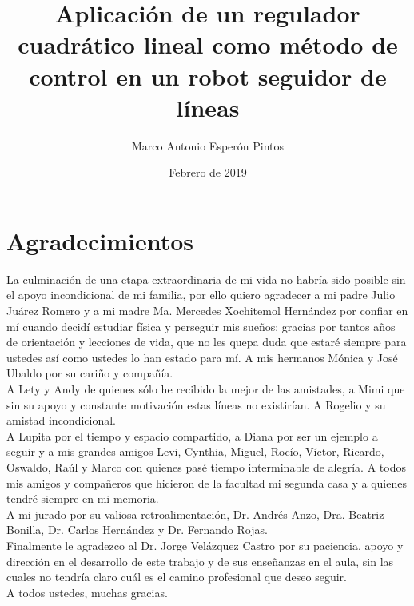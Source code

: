 \documentclass[fisica]{fcfmtesis}
\author{Marco Antonio Esperón Pintos}
\title{Aplicación de un regulador cuadrático lineal como método de control en un robot seguidor de líneas}
\date{Febrero de 2019}
\begin{document}
\frontmatter
  \portada
  \maketitle
  \makeacta
  
  \setcounter{page}{4}
  
  \chapter*{Agradecimientos}
  La culminación de una etapa extraordinaria de mi vida no habría sido posible sin el apoyo incondicional de mi familia, por ello quiero agradecer a mi padre Julio Juárez Romero y a mi madre Ma. Mercedes Xochitemol Hernández por confiar en mí cuando decidí estudiar física y perseguir mis sueños; gracias por tantos años de orientación y lecciones de vida, que no les quepa duda que estaré siempre para ustedes así como ustedes lo han estado para mí. A mis hermanos Mónica y José Ubaldo por su cariño y compañía.\\
  
  A Lety y Andy de quienes sólo he recibido la mejor de las amistades, a Mimi que sin su apoyo y constante motivación estas líneas no existirían. A Rogelio y su amistad incondicional.\\
  
  A Lupita por el tiempo y espacio compartido, a Diana por ser un ejemplo a seguir y a mis grandes amigos Levi, Cynthia, Miguel, Rocío, Víctor, Ricardo, Oswaldo, Raúl y Marco con quienes pasé tiempo interminable de alegría. A todos mis amigos y compañeros que hicieron de la facultad mi segunda casa y a quienes tendré siempre en mi memoria.\\
  
  A mi jurado por su valiosa retroalimentación, Dr. Andrés Anzo,  Dra. Beatriz Bonilla, Dr. Carlos Hernández y  Dr. Fernando Rojas.\\
  
  Finalmente le agradezco al Dr. Jorge Velázquez Castro por su paciencia, apoyo y dirección en el desarrollo de este trabajo y de sus enseñanzas en el aula, sin las cuales no tendría claro cuál es el camino profesional que deseo seguir.\\
  
  A todos ustedes, muchas gracias.
  
  \tableofcontents
  \listoffigures
  \listoftables
\end{document}
